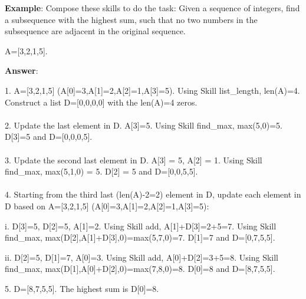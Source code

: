 \documentclass{article} \usepackage{arxiv}
\begin{document}
\begin{tcolorbox}[title = {An Example of Skill Composition for the Dynamic Programming Task}, colback = Apricot!25!white, colframe = BrickRed!75!black] 
\textbf{Example}: Compose these skills to do the task: Given a sequence of integers, find a subsequence with the highest sum, such that no two numbers in the subsequence are adjacent in the original sequence.  

A=[3,2,1,5].

 \quad

\textbf{Answer}:

1. A=[3,2,1,5] (A[0]=3,A[1]=2,A[2]=1,A[3]=5). Using Skill list\_length, len(A)=4. Construct a list D=[0,0,0,0] with the len(A)=4 zeros. \\ \\
2. Update the last element in D. A[3]=5. Using Skill find\_max, max(5,0)=5. D[3]=5 and D=[0,0,0,5]. \\ \\
3. Update the second last element in D. A[3] = 5, A[2] = 1. Using Skill find\_max, max(5,1,0) = 5. D[2] = 5 and D=[0,0,5,5]. \\ \\ 
4. Starting from the third last (len(A)-2=2) element in D, update each element in D based  on A=[3,2,1,5] (A[0]=3,A[1]=2,A[2]=1,A[3]=5): 

\quad

 \qquad   i. D[3]=5, D[2]=5, A[1]=2. Using Skill add, A[1]+D[3]=2+5=7.  Using Skill find\_max, max(D[2],A[1]+D[3],0)=max(5,7,0)=7.  D[1]=7 and D=[0,7,5,5]. 

 
  \qquad  ii. D[2]=5, D[1]=7, A[0]=3. Using Skill add, A[0]+D[2]=3+5=8. Using Skill find\_max, max(D[1],A[0]+D[2],0)=max(7,8,0)=8. D[0]=8 and D=[8,7,5,5]. 

\quad
  
5.  D=[8,7,5,5]. The highest sum is D[0]=8. 
\end{tcolorbox}
\noindent\begin{minipage}{\textwidth}    
 \label{Tab:compose_dp_skill}
\end{minipage}

\newpage
\end{document}
